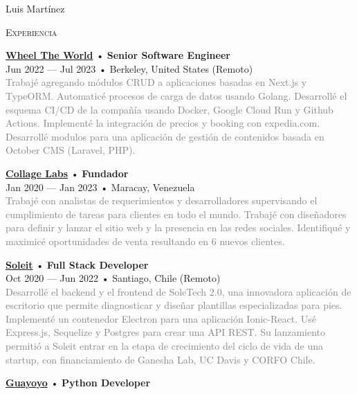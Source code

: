 \documentclass[12pt]{article}
\begin{document}
\begin{cv}{Luis Mart\'inez}
\begin{minipage}[t]{0.55\textwidth}
    \textrm{\textsc{\Large{Experiencia}}}
    \newline
    \parbox[t]{\linewidth}{
      \textbf{\href{https://wheeltheworld.com}{Wheel The World}} • \textrm{\textbf{Senior Software Engineer}}\\
      Jun 2022 --- Jul 2023 • Berkeley, United States (Remoto)\\
      \footnotesize{\textcolor{gray}{Trabajé agregando módulos CRUD a aplicaciones basadas en Next.js y TypeORM. Automaticé procesos de carga de datos usando Golang. Desarrollé el esquema CI/CD de la compañía usando Docker, Google Cloud Run y Github Actions. Implementé la integración de precios y booking con expedia.com. Desarrollé modulos para una aplicación de gestión de contenidos basada en October CMS (Laravel, PHP).}}\\
    }\vspace{0.125em}
    \parbox[t]{\linewidth}{
      \textbf{\href{https://collagelabs.org}{Collage Labs}} • \textrm{\textbf{Fundador}}\\
      Jan 2020 --- Jan 2023 • Maracay, Venezuela\\
      \footnotesize{\textcolor{gray}{Trabajé con analistas de requerimientos y desarrolladores supervisando el cumplimiento de tareas para clientes en todo el mundo. Trabajé con diseñadores para definir y lanzar el sitio web y la presencia en las redes sociales. Identifiqué y maximicé oportunidades de venta resultando en 6 nuevos clientes.}}\\
    }\vspace{0.125em}
    \parbox[t]{\linewidth}{
      \textbf{\href{https://soleit.app}{Soleit}} • \textrm{\textbf{Full Stack Developer}}\\
      Oct 2020 --- Jun 2022 • Santiago, Chile (Remoto)\\
      \footnotesize{\textcolor{gray}{Desarrollé el backend y el frontend de SoleTech 2.0, una innovadora aplicación de escritorio que permite diagnosticar y diseñar plantillas especializadas para pies. Implementé un contenedor Electron para una aplicación Ionic-React. Usé Express.js, Sequelize y Postgres para crear una API REST. Su lanzamiento permitió a Soleit entrar en la etapa de crecimiento del ciclo de vida de una startup, con financiamiento de Ganesha Lab, UC Davis y CORFO Chile.}}\\
    }\vspace{0.125em}
    \parbox[t]{\linewidth}{
      \textbf{\href{https://guayoyo.io}{Guayoyo}} • \textrm{\textbf{Python Developer}}\\
}
\end{minipage}
\end{cv}
\end{document}
